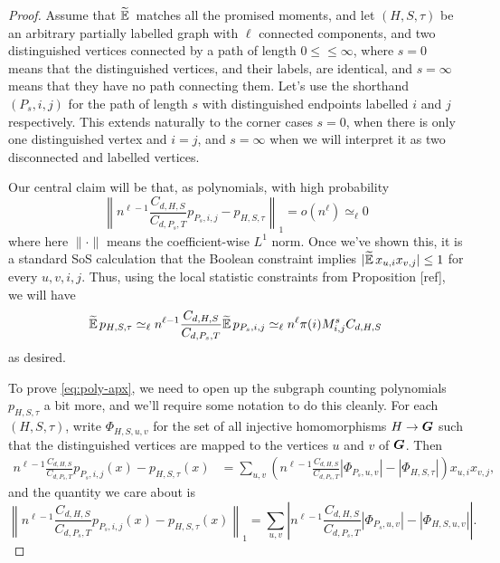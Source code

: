 \begin{proof}
    Assume that $\widetilde{\operatorname*{\mathbb{E}}}\,$ matches all the promised moments, and let $(H,S,\tau)$ be an arbitrary partially labelled graph with $\ell$ connected components, and two distinguished vertices connected by a path of length $0 \le \le \infty$, where $s = 0$ means that the distinguished vertices, and their labels, are identical, and $s = \infty$ means that they have no path connecting them. Let's use the shorthand $(P_s,i,j)$ for the path of length $s$ with distinguished endpoints labelled $i$ and $j$ respectively. This extends naturally to the corner cases $s = 0$, when there is only one distinguished vertex and $i = j$, and $s = \infty$ when we will interpret it as two disconnected and labelled vertices.

    Our central claim will be that, as polynomials, with high probability
    \begin{equation} \label{eq:poly-apx}
        \left\| n^{\ell - 1}\frac{C_{d,H,S}}{C_{d,P_s,T}}p_{P_s,i,j} - p_{H,S,\tau} \right\|_1 = o(n^\ell) \simeq_\ell 0
    \end{equation}
    where here $\|\cdot \|$ means the coefficient-wise $L^1$ norm. Once we've shown this, it is a standard SoS calculation that the Boolean constraint implies $|\widetilde{\operatorname*{\mathbb{E}}}\, x_{u,i}x_{v,j}| \le 1$ for every $u,v,i,j$. Thus, using the local statistic constraints from Proposition [ref], we will have
    $$
        \widetilde{\operatorname*{\mathbb{E}}}\, p_{H,S,\tau} \simeq_\ell n^{\ell - 1}\frac{C_{d,H,S}}{C_{d,P_s,T}} \widetilde{\operatorname*{\mathbb{E}}}\, p_{P_s,i,j} \simeq_\ell n^\ell \pi(i)M_{i,j}^s C_{d,H,S}
    $$
    as desired.

    To prove \eqref{eq:poly-apx}, we need to open up the subgraph counting polynomials $p_{H,S,\tau}$ a bit more, and we'll require some notation to do this cleanly. For each $(H,S,\tau)$, write $\Phi_{H,S,u,v}$ for the set of all injective homomorphisms $H \to \boldsymbol{G}$ such that the distinguished vertices are mapped to the vertices $u$ and $v$ of $\boldsymbol{G}$. Then
    \begin{align*}
        n^{\ell - 1}\frac{C_{d,H,S}}{C_{d,P_s,T}} p_{P_s,i,j}(x) - p_{H,S,\tau}(x)
        &= \sum_{u,v} \left(n^{\ell - 1}\frac{C_{d,H,S}}{C_{d,P_s,T}}|\Phi_{P_s,u,v}| - |\Phi_{H,S,\tau}| \right) x_{u,i}x_{v,j},
    \end{align*}
    and the quantity we care about is
    $$
        \left\| n^{\ell - 1}\frac{C_{d,H,S}}{C_{d,P_s,T}} p_{P_s,i,j}(x) - p_{H,S,\tau}(x) \right\|_1 = \sum_{u,v} \left|n^{\ell - 1}\frac{C_{d,H,S}}{C_{d,P_s,T}}|\Phi_{P_s,u,v}| - |\Phi_{H,S,u,v}| \right|.
    $$


\end{proof}
